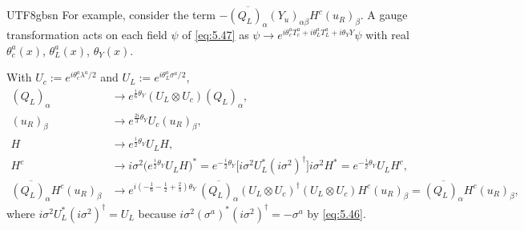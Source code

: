 \documentclass[11pt,a4paper,oneside]{report}
\begin{document}
\begin{CJK*}{UTF8}{gbsn}
For example, consider the term $-\overline{(Q_L)_\alpha}(Y_u)_{\alpha\beta}H^c(u_R)_\beta$. A gauge transformation acts on each field $\psi$ of \eqref{eq:5.47} as $\psi\to e^{i\theta_c^aT_c^a+i\theta_L^aT_L^a+i\theta_YY}\psi$ with real $\theta_c^a(x)$, $\theta_L^a(x)$, $\theta_Y(x)$.

With $U_c:=e^{i\theta_c^a\lambda^a/2}$ and $U_L:=e^{i\theta_L^a\sigma^a/2}$,
\begin{equation*}
\begin{aligned}
(Q_L)_\alpha&\to e^{\frac i6\theta_Y}(U_L\otimes U_c)(Q_L)_\alpha,\\
(u_R)_\beta&\to e^{\frac{2i}3\theta_Y}U_c(u_R)_\beta,\\
H&\to e^{\frac i2\theta_Y}U_LH,\\
H^c&\to i\sigma^2\bigl(e^{\frac i2\theta_Y}U_LH\bigr)^*=e^{-\frac i2\theta_Y}\bigl[i\sigma^2U_L^*(i\sigma^2)^\dagger\bigr]i\sigma^2H^*=e^{-\frac i2\theta_Y}U_LH^c,\\
\overline{(Q_L)_\alpha}H^c(u_R)_\beta&\to e^{i(-\frac16-\frac12+\frac23)\theta_Y}\,\overline{(Q_L)_\alpha}(U_L\otimes U_c)^\dagger(U_L\otimes U_c)H^c(u_R)_\beta=\overline{(Q_L)_\alpha}H^c(u_R)_\beta,
\end{aligned}
\tag{5.52}\label{eq:5.52}
\end{equation*}
where $i\sigma^2U_L^*(i\sigma^2)^\dagger=U_L$ because $i\sigma^2(\sigma^a)^*(i\sigma^2)^\dagger=-\sigma^a$ by \eqref{eq:5.46}.


\end{CJK*}
\end{document}
